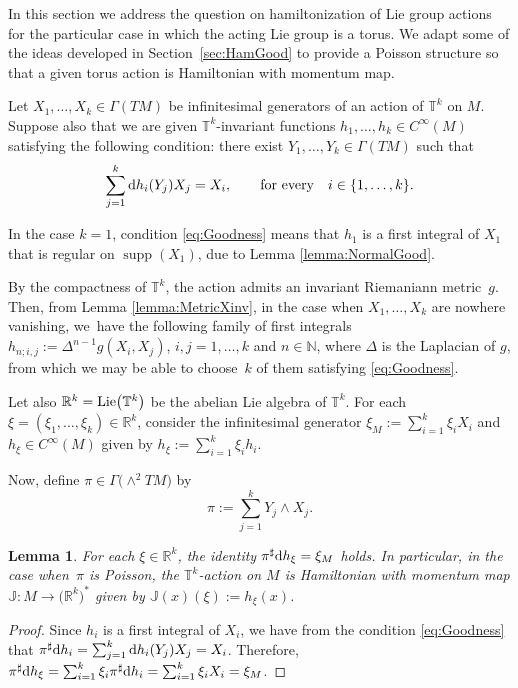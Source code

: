 \documentclass[pdftex]{sigma}%
\newcommand{\R}[1]{\mathbb{R}^{#1}}
\newcommand{\dd}{{\rm d}}
\numberwithin{equation}{section}
\newtheorem{Lemma}[Theorem]{Lemma}
\begin{document}
In this section we address the question on hamiltonization of Lie group actions for the particular case in which the acting Lie group is a torus. We adapt some of the ideas developed in Section~\ref{sec:HamGood} to provide a Poisson structure so that a given torus action is Hamiltonian with momentum map.

Let $X_{1}, \dots, X_{k} \in \Gamma(TM)$ be infinitesimal generators of an action of $\mathbb{T}^{k}$ on $M$. Suppose also that we are given $\mathbb{T}^{k}$-invariant functions $h_{1},\dots,h_{k} \in C^{\infty}(M)$ satisfying the following condition: there exist $Y_1,\dots,Y_{k} \in \Gamma(TM)$ such that
 \begin{equation}\label{eq:Goodness}
 \sum_{j=1}^{k}\dd h_{i}(Y_{j})X_{j} = X_{i},\qquad \text{for every}\quad i \in \{1,\dots,k\}.
 \end{equation}

\begin{Remark}
In the case $k=1$, condition \eqref{eq:Goodness} means that $h_{1}$ is a first integral of $X_{1}$ that is regular on $\operatorname{supp}(X_{1})$, due to Lemma \ref{lemma:NormalGood}.
\end{Remark}

\begin{Remark}
By the compactness of $\mathbb{T}^k$, the action admits an invariant Riema\-niann metric~$g$. Then, from Lemma \ref{lemma:MetricXinv}, in the case when $X_1, \dots, X_{k}$ are nowhere vanishing, we~have the following family of first integrals $h_{n;i,j}:=\Delta^{n-1}g(X_i,X_j)$, $i,j=1,\dots,k$ and $n\in\mathbb{N}$, where $\Delta$ is the Laplacian of $g$, from which we may be able to choose~$k$ of them satisfying \eqref{eq:Goodness}.
\end{Remark}

Let also $\R{k} = {\rm Lie}\big(\mathbb{T}^{k}\big)$ be the abelian Lie algebra of $\mathbb{T}^{k}$. For each $\xi = (\xi_1,\dots,\xi_{k}) \in \R{k}$, consider the infinitesimal generator $\xi_{M} := \sum_{i=1}^{k}\xi_{i}X_{i}$ and $h_{\xi} \in C^{\infty}(M)$ given by $h_{\xi} := \sum_{i=1}^{k}\xi_{i}h_{i}$.

Now, define $\pi \in \Gamma\big({\wedge}^{2}TM\big)$ by
 \begin{equation}\label{eq:PoissTorus}
 \pi := \sum_{j=1}^{k}Y_{j}\wedge X_{j}.
 \end{equation}

\begin{Lemma}\label{lemma:PoissToric0}
For each $\xi \in \R{k}$, the identity $\pi^{\sharp}\dd h_{\xi} = \xi_{M}$ holds. In particular, in the case when~$\pi$ is Poisson, the $\mathbb{T}^{k}$-action on $M$ is Hamiltonian with momentum map $\mathbb{J}\colon M \to \big(\R{k}\big)^{*}$ given by $\mathbb{J}(x)(\xi) := h_{\xi}(x)$.
\end{Lemma}
\begin{proof}
Since $h_{i}$ is a first integral of $X_{i}$, we have from the condition \eqref{eq:Goodness} that $\pi^{\sharp} \dd h_{i} = \sum_{j=1}^{k} \dd h_{i} (Y_{j}) X_{j} = X_{i}$. Therefore, $\pi^{\sharp}\dd h_{\xi} = \sum_{i=1}^{k}\xi_{i}\pi^{\sharp}\dd h_{i} = \sum_{i=1}^{k}\xi_{i}X_{i} = \xi_{M}$.
\end{proof}
\end{document}
